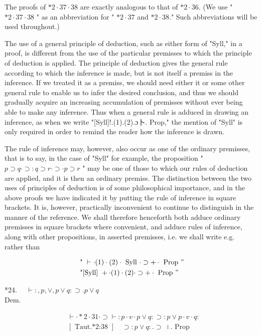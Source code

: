\documentclass[10pt]{article}
\begin{document}
The proofs of $* 2 \cdot 37 \cdot 38$ are exactly analogous to that of $* 2 \cdot 36$. (We use " $* 2 \cdot 37 \cdot 38$ " as an abbreviation for " $* 2 \cdot 37$ and $* 2 \cdot 38$." Such abbreviations will be used throughout.)

The use of a general principle of deduction, such as either form of "Syll," in a proof, is different from the use of the particular premisses to which the principle of deduction is applied. The principle of deduction gives the general rule according to which the inference is made, but is not itself a premiss in the inference. If we treated it as a premiss, we should need either it or some other general rule to enable us to infer the desired conclusion, and thus we should gradually acquire an increasing accumulation of premisses without ever being able to make any inference. Thus when a general rule is adduced in drawing an inference, as when we write "[Syll]!.(1).(2).ɔ卜. Prop," the mention of "Syll" is only required in order to remind the reader how the inference is drawn.

The rule of inference may, however, also occur as one of the ordinary premisses, that is to say, in the case of "Syll" for example, the proposition " $p \supset q \cdot \supset: q \supset r \cdot \supset \cdot p \supset r$ " may be one of those to which our rules of deduction are applied, and it is then an ordinary premiss. The distinction between the two uses of principles of deduction is of some philosophical importance, and in the above proofs we have indicated it by putting the rule of inference in square brackets. It is, however, practically inconvenient to continue to distinguish in the manner of the reference. We shall therefore henceforth both adduce ordinary premisses in square brackets where convenient, and adduce rules of inference, along with other propositions, in asserted premisses, i.e. we shall write e.g.\\
rather than

$$
\begin{aligned}
& \text { " } \vdash \cdot(1) \cdot(2) \cdot \text { Syll } \cdot \supset+\cdot \text { Prop } " \\
& \text { "[Syll] }+\cdot(1) \cdot(2) \cdot \supset+\cdot \text { Prop } "
\end{aligned}
$$

*24. $\quad \vdash:, p, \vee, p \vee q: \supset . p \vee q$\\
Dem.

$$
\begin{aligned}
& \vdash \cdot * 2 \cdot 31 \cdot \supset \vdash: p \cdot v \cdot p \vee q: \supset: p \vee p \cdot v \cdot q: \\
& {[\text { Taut.*2:38 }] \quad \supset: p \vee q: . \supset \text { ।. Prop }}
\end{aligned}
$$
\end{document}
